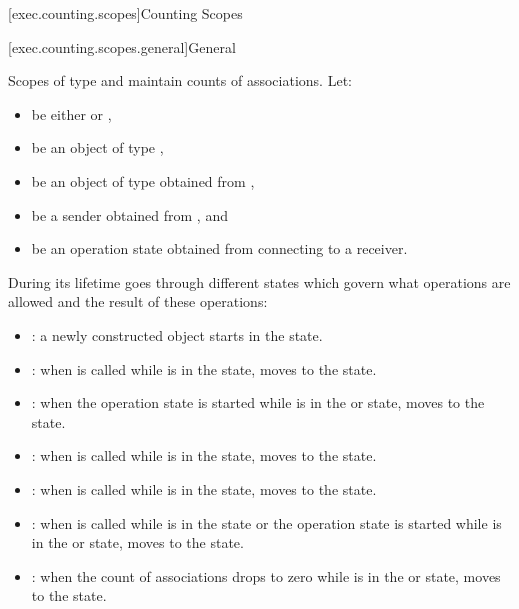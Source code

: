 [exec.counting.scopes]{Counting Scopes}

[exec.counting.scopes.general]{General}

\pnum
Scopes of type  and 
maintain counts of associations.
Let:
\begin{itemize}
\item
{} be either  or ,
\item
{} be an object of type ,
\item
{} be an object of type 
obtained from ,
\item
{} be a sender obtained from , and
\item
{} be an operation state obtained from
connecting  to a receiver.
\end{itemize}
During its lifetime  goes through different states
which govern what operations are allowed and the result of these operations:

\begin{itemize}
\item
{}:
a newly constructed object starts in the  state.

\item
{}:
when  is called
while  is in the  state,
 moves to the  state.

\item
{}:
when the operation state  is started
while  is in the  or  state,
 moves to the  state.

\item
{}:
when  is called
while  is in the  state,
 moves to the  state.

\item
{}:
when  is called
while  is in the  state,
 moves to the  state.

\item
{}:
when  is called
while  is in the  state or
the operation state  is started
while  is in
the  or  state,
 moves to the  state.

\item
{}:
when the count of associations drops to zero
while  is in
the  or  state,
 moves to the  state.
\end{itemize}

